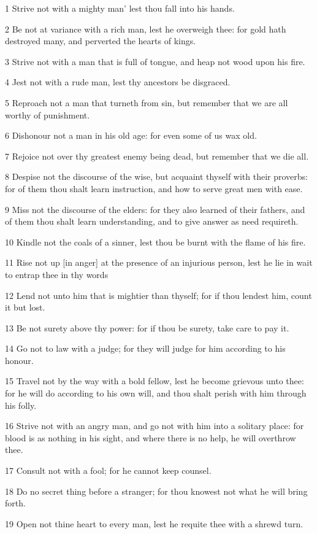 \par 1 Strive not with a mighty man' lest thou fall into his hands.
\par 2 Be not at variance with a rich man, lest he overweigh thee: for gold hath destroyed many, and perverted the hearts of kings.
\par 3 Strive not with a man that is full of tongue, and heap not wood upon his fire.
\par 4 Jest not with a rude man, lest thy ancestors be disgraced.
\par 5 Reproach not a man that turneth from sin, but remember that we are all worthy of punishment.
\par 6 Dishonour not a man in his old age: for even some of us wax old.
\par 7 Rejoice not over thy greatest enemy being dead, but remember that we die all.
\par 8 Despise not the discourse of the wise, but acquaint thyself with their proverbs: for of them thou shalt learn instruction, and how to serve great men with ease.
\par 9 Miss not the discourse of the elders: for they also learned of their fathers, and of them thou shalt learn understanding, and to give answer as need requireth.
\par 10 Kindle not the coals of a sinner, lest thou be burnt with the flame of his fire.
\par 11 Rise not up [in anger] at the presence of an injurious person, lest he lie in wait to entrap thee in thy words
\par 12 Lend not unto him that is mightier than thyself; for if thou lendest him, count it but lost.
\par 13 Be not surety above thy power: for if thou be surety, take care to pay it.
\par 14 Go not to law with a judge; for they will judge for him according to his honour.
\par 15 Travel not by the way with a bold fellow, lest he become grievous unto thee: for he will do according to his own will, and thou shalt perish with him through his folly.
\par 16 Strive not with an angry man, and go not with him into a solitary place: for blood is as nothing in his sight, and where there is no help, he will overthrow thee.
\par 17 Consult not with a fool; for he cannot keep counsel.
\par 18 Do no secret thing before a stranger; for thou knowest not what he will bring forth.
\par 19 Open not thine heart to every man, lest he requite thee with a shrewd turn.


